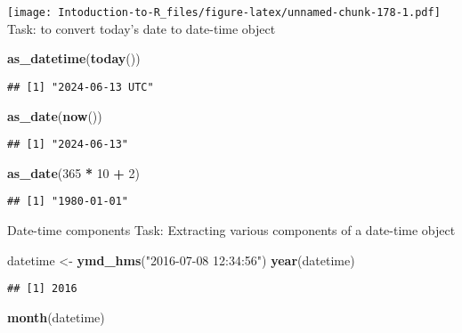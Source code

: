 \documentclass[
]{article}
\newenvironment{Shaded}{\begin{snugshade}}{\end{snugshade}}
\newcommand{\DecValTok}[1]{\textcolor[rgb]{0.00,0.00,0.81}{#1}}
\newcommand{\FunctionTok}[1]{\textcolor[rgb]{0.13,0.29,0.53}{\textbf{#1}}}
\newcommand{\NormalTok}[1]{#1}
\newcommand{\OtherTok}[1]{\textcolor[rgb]{0.56,0.35,0.01}{#1}}
\newcommand{\SpecialCharTok}[1]{\textcolor[rgb]{0.81,0.36,0.00}{\textbf{#1}}}
\newcommand{\StringTok}[1]{\textcolor[rgb]{0.31,0.60,0.02}{#1}}
\begin{document}
\texttt{[image: Intoduction-to-R\_files/figure-latex/unnamed-chunk-178-1.pdf]}
Task: to convert today's date to date-time object

\begin{Shaded}
\begin{Highlighting}[]
\FunctionTok{as\_datetime}\NormalTok{(}\FunctionTok{today}\NormalTok{())}
\end{Highlighting}
\end{Shaded}

\begin{verbatim}
## [1] "2024-06-13 UTC"
\end{verbatim}

\begin{Shaded}
\begin{Highlighting}[]
\FunctionTok{as\_date}\NormalTok{(}\FunctionTok{now}\NormalTok{())}
\end{Highlighting}
\end{Shaded}

\begin{verbatim}
## [1] "2024-06-13"
\end{verbatim}

\begin{Shaded}
\begin{Highlighting}[]
\FunctionTok{as\_date}\NormalTok{(}\DecValTok{365} \SpecialCharTok{*} \DecValTok{10} \SpecialCharTok{+} \DecValTok{2}\NormalTok{)}
\end{Highlighting}
\end{Shaded}

\begin{verbatim}
## [1] "1980-01-01"
\end{verbatim}

Date-time components Task: Extracting various components of a date-time
object

\begin{Shaded}
\begin{Highlighting}[]
\NormalTok{datetime }\OtherTok{\textless{}{-}} \FunctionTok{ymd\_hms}\NormalTok{(}\StringTok{"2016{-}07{-}08 12:34:56"}\NormalTok{)}
\FunctionTok{year}\NormalTok{(datetime)}
\end{Highlighting}
\end{Shaded}

\begin{verbatim}
## [1] 2016
\end{verbatim}

\begin{Shaded}
\begin{Highlighting}[]
\FunctionTok{month}\NormalTok{(datetime)}
\end{Highlighting}
\end{Shaded}
\end{document}
